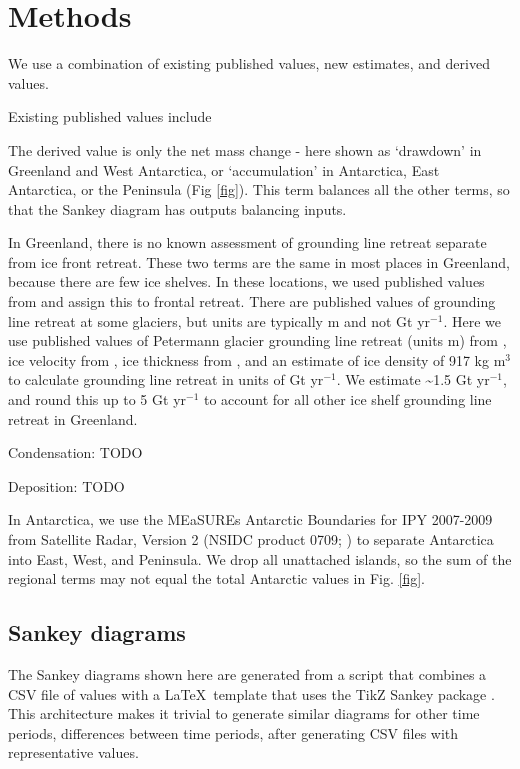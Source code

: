 \documentclass[jog]{igs}
\begin{document}
\section{Methods}

We use a combination of existing published values, new estimates, and derived values.

Existing published values include 

The derived value is only the net mass change - here shown as `drawdown' in Greenland and West Antarctica, or `accumulation' in Antarctica, East Antarctica, or the Peninsula (Fig \ref{fig}). This term balances all the other terms, so that the Sankey diagram has outputs balancing inputs.

In Greenland, there is no known assessment of grounding line retreat separate from ice front retreat. These two terms are the same in most places in Greenland, because there are few ice shelves. In these locations, we used published values from \citet{kochtitzky_2023} and assign this to frontal retreat. There are published values of grounding line retreat at some glaciers, but units are typically m and not Gt yr$^{-1}$. Here we use published values of Petermann glacier grounding line retreat (units m) from \citet{millan_2022}, ice velocity from \citet{millan_2022}, ice thickness from \citet{ciraci_2023}, and an estimate of ice density of 917 kg m$^{3}$ to calculate grounding line retreat in units of Gt yr$^{-1}$. We estimate \sim 1.5 Gt yr$^{-1}$, and round this up to 5 Gt yr$^{-1}$ to account for all other ice shelf grounding line retreat in Greenland.

Condensation: TODO

Deposition: TODO

In Antarctica, we use the MEaSUREs Antarctic Boundaries for IPY 2007-2009 from Satellite Radar, Version 2 (NSIDC product 0709; \citet{mouginot_2017,rignot_2013}) to separate Antarctica into East, West, and Peninsula. We drop all unattached islands, so the sum of the regional terms may not equal the total Antarctic values in Fig. \ref{fig}.

\subsection{Sankey diagrams}

The Sankey diagrams shown here are generated from a script that combines a CSV file of values with a \LaTeX\ template that uses the TikZ Sankey package \citep{sankey}. This architecture makes it trivial to generate similar diagrams for other time periods, differences between time periods, after generating CSV files with representative values. 
\end{document}
